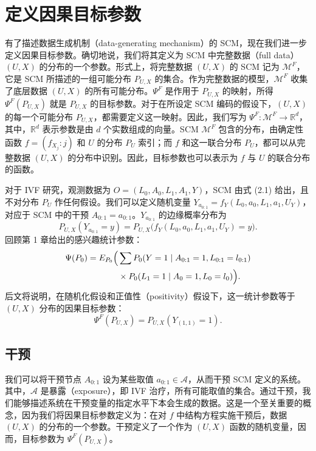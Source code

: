 \section{定义因果目标参数}
\label{sec:ch02-causal-target}

有了描述数据生成机制（data-generating mechanism）的 SCM，现在我们进一步定义因果目标参数。确切地说，我们将其定义为 SCM 中完整数据（full data）$(U,X)$ 的分布的一个参数。形式上，将完整数据 $(U,X)$ 的 SCM 记为 $\mathcal M^F$，它是 SCM 所描述的一组可能分布 $P_{U,X}$ 的集合。作为完整数据的模型，$\mathcal M^F$ 收集了底层数据 $(U,X)$ 的所有可能分布。$\Psi^F$ 是作用于 $P_{U,X}$ 的映射，所得 $\Psi^F(P_{U,X})$ 就是 $P_{U,X}$ 的目标参数。对于在所设定 SCM 编码的假设下，$(U,X)$ 的每一个可能分布 $P_{U,X}$，都需要定义这一映射。因此，我们写为 $\Psi^F\colon\mathcal M^F\to\mathbb R^d$，其中，$\mathbb R^d$ 表示参数是由 $d$ 个实数组成的向量。SCM $\mathcal M^F$ 包含的分布，由确定性函数 $f=(f_{X_j}:j)$ 和 $U$ 的分布 $P_U$ 索引；而 $f$ 和这一联合分布 $P_U$，都可以从完整数据 $(U,X)$ 的分布中识别。因此，目标参数也可以表示为 $f$ 与 $U$ 的联合分布的函数。

对于 IVF 研究，观测数据为 $O=(L_0,A_0,L_1,A_1,Y)$，SCM 由式 (2.1) 给出，且不对分布 $P_U$ 作任何假设。我们可以定义随机变量 $Y_{a_{0:1}}=f_Y(L_0,a_0,L_1,a_1,U_Y)$，对应于 SCM 中的干预 $A_{0:1}=a_{0:1}$。$Y_{a_{0:1}}$ 的边缘概率分布为
\[
 P_{U,X}(Y_{a_{0:1}}=y)
 =P_{U,X}\bigl(f_Y(L_0,a_0,L_1,a_1,U_Y)=y\bigr).
\]
回顾第 1 章给出的感兴趣统计参数：
\[
 \begin{aligned}
 \Psi(P_0)=E_{P_0}\Bigl(&\sum P_0(Y=1\mid A_{0:1}=1,L_{0:1}=l_{0:1})\\
 &{}\times P_0(L_1=1\mid A_0=1,L_0=l_0)\Bigr).
 \end{aligned}
\]
后文将说明，在随机化假设和正值性（positivity）假设下，这一统计参数等于 $(U,X)$ 分布的因果目标参数：
\[
 \Psi^F(P_{U,X})=P_{U,X}(Y_{(1,1)}=1).
\]

\subsection{干预}
\label{subsec:ch02-interventions}

我们可以将干预节点 $A_{0:1}$ 设为某些取值 $a_{0:1}\in\mathcal A$，从而干预 SCM 定义的系统。其中，$\mathcal A$ 是暴露（exposure），即 IVF 治疗，所有可能取值的集合。通过干预，我们能够描述系统在干预变量的指定水平下本会生成的数据。这是一个至关重要的概念，因为我们将因果目标参数定义为：在对 $f$ 中结构方程实施干预后，数据 $(U,X)$ 的分布的一个参数。干预定义了一个作为 $(U,X)$ 函数的随机变量，因而，目标参数为 $\Psi^F(P_{U,X})$。

